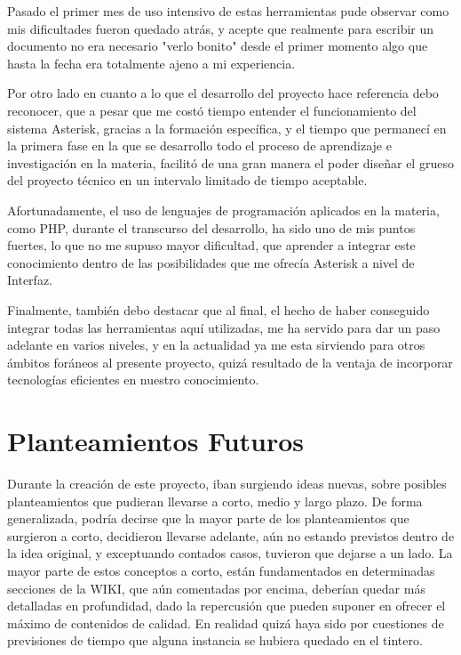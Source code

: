 Pasado el primer mes de uso intensivo de estas herramientas pude observar como mis dificultades fueron quedado atrás, y acepte que realmente para escribir un documento no era necesario "verlo bonito" desde el primer momento algo que hasta la fecha era totalmente ajeno a mi experiencia.

Por otro lado en cuanto a lo que el desarrollo del proyecto hace referencia debo reconocer, que a pesar que me costó tiempo entender el funcionamiento del sistema Asterisk, gracias a la formación específica, y el tiempo que permanecí en la primera fase en la que se desarrollo todo el proceso de aprendizaje e investigación en la materia, facilitó de una gran manera el poder diseñar el grueso del proyecto técnico en un intervalo limitado de tiempo aceptable.

Afortunadamente, el uso de lenguajes de programación aplicados en la materia, como PHP, durante el transcurso del desarrollo, ha sido uno de mis puntos fuertes, lo que no me supuso mayor dificultad, que aprender a integrar este conocimiento dentro de las posibilidades que me ofrecía Asterisk a nivel de Interfaz.

Finalmente, también debo destacar que al final, el hecho de haber conseguido integrar todas las herramientas aquí utilizadas, me ha servido para dar un paso adelante en varios niveles, y en la actualidad ya me esta sirviendo para otros ámbitos foráneos al presente proyecto, quizá resultado de la ventaja de incorporar tecnologías eficientes en nuestro conocimiento.

\section{Planteamientos Futuros}

Durante la creación de este proyecto, iban surgiendo ideas nuevas, sobre posibles planteamientos que pudieran llevarse a corto, medio y largo plazo. De forma generalizada, podría decirse que la mayor parte de los planteamientos que surgieron a corto, decidieron llevarse adelante, aún no estando previstos dentro de la idea original, y exceptuando contados casos, tuvieron que dejarse a un lado. La mayor parte de estos conceptos a corto, están fundamentados en determinadas secciones de la WIKI, que aún comentadas por encima, deberían quedar más detalladas en profundidad, dado la repercusión que pueden suponer en ofrecer el máximo de contenidos de calidad. En realidad quizá haya sido por cuestiones de previsiones de tiempo que alguna instancia se hubiera quedado en el tintero.

